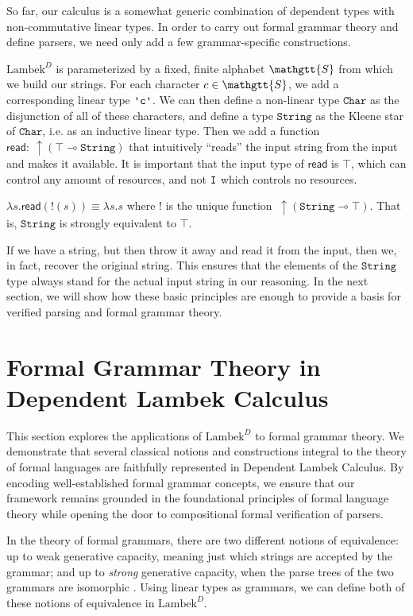 \documentclass[acmsmall,nonacm]{acmart}
\renewcommand{\Sigma}{\mathgtt{S}}
\newcommand{\lto}{\multimap}
\newcommand{\CharGram}{\texttt{Char}}
\newcommand{\StringGram}{\texttt{String}}
\newcommand{\theoryname}{Dependent Lambek Calculus\xspace}
\newcommand{\theoryabbv}{$\textrm{Lambek}^D$\xspace}
\newcommand{\ltonl}[1]{~\uparrow #1}
\newcommand{\literal}[1]{\texttt{\textquotesingle#1\textquotesingle}}
\begin{document}
So far, our calculus is a somewhat generic combination of dependent
types with non-commutative linear types. In order to carry out formal
grammar theory and define parsers, we need only add a few
grammar-specific constructions.

\theoryabbv is parameterized by a fixed, finite alphabet $\Sigma$ from which we
build our strings.  For each character $c \in \Sigma$,
we add a corresponding linear type $\literal{c}$. We can then define a
non-linear type $\CharGram$ as the disjunction of all of these characters,
and define a type $\StringGram$ as the Kleene star of $\CharGram$, i.e. as an
inductive linear type.
Then we add a function $\mathsf{read} :
\ltonl{(\top\lto \StringGram)}$ that intuitively ``reads'' the input
string from the input and makes it available. It is important that the
input type of $\mathsf{read}$ is $\top$, which can control any amount
of resources, and not $\texttt{I}$ which controls no resources.


\begin{axiom}
  \label{ax:string-top}
   $\lambda s. \mathsf{read}(!(s)) \equiv \lambda
s. s$ where $!$ is the unique function $\ltonl(\StringGram\lto \top)$. That is, $\StringGram$ is strongly equivalent to $\top$.
\end{axiom}

If we have a string, but then throw it away and read
it from the input, then we, in fact, recover the original string.
This ensures that the elements of the $\StringGram$
type always stand for the actual input string in our reasoning. In the
next section, we will show how these basic principles are enough to
provide a basis for verified parsing and formal grammar theory.

\section{Formal Grammar Theory in \theoryname}
\label{sec:applications}
This section explores the applications of \theoryabbv to formal
grammar theory. We demonstrate that several classical notions and constructions
integral to the theory of formal languages are faithfully represented
in \theoryname. By encoding well-established formal grammar concepts, we ensure
that our framework remains grounded in the
foundational principles of formal language theory while opening the door to
compositional formal verification of parsers.

In the theory of formal grammars, there are two different notions of
equivalence: up to weak generative capacity, meaning just which strings are
accepted by the grammar; and up to \emph{strong} generative capacity, when
the parse trees of the two grammars are isomorphic
\cite{chom1963}. Using linear types as grammars, we can define both of
these notions of equivalence in \theoryabbv.
\end{document}
